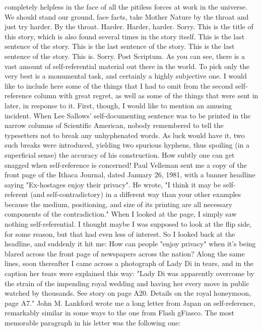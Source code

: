 completely helpless in the face of all the pitiless forces at work in the universe. We should stand our ground, face facts, take Mother Nature by the throat and just try harder. By the throat. Harder. Harder, harder. Sorry. This is the title of this story, which is also found several times in the story itself. This is the last sentence of the story. This is the last sentence of the story. This is the last sentence of the story. This is. Sorry. 
Post Scriptum. As you can see, there is a vast amount of self-referential material out there in the world. To pick only the very best is a monumental task, and certainly a highly subjective one. I would like to include here some of the things that I had to omit from the second self-reference column with great regret, as well as some of the things that were sent in later, in response to it. First, though, I would like to mention an amusing incident. When Lee Sallows' self-documenting sentence was to be printed in the narrow columns of Scientific American, nobody remembered to tell the typesetters not to break any unhyphenated words. As luck would have it, two such breaks were introduced, yielding two spurious hyphens, thus spoiling (in a superficial sense) the accuracy of his construction. How subtly one can get snagged when self-reference is concerned! Paul Velleman sent me a copy of the front page of the Ithaca Journal, dated January 26, 1981, with a banner headline saying "Ex-hostages enjoy their privacy". He wrote, "I think it may be self-referent (and self-contradictory) in a different way than your other examples because the medium, positioning, and size of its printing are all necessary components of the contradiction." When I looked at the page, I simply saw nothing self-referential. I thought maybe I was supposed to look at the flip side, for some reason, but that had even less of interest. So I looked back at the headline, and suddenly it hit me: How can people "enjoy privacy" when it's being blared across the front page of newspapers across the nation? Along the same lines, soon thereafter I came across a photograph of Lady Di in tears, and in the caption her tears were explained this way: "Lady Di was apparently overcome by the strain of the impending royal wedding and having her every move in public watched by thousands. See story on page A20. Details on the royal honeymoon, page A7." John M. Lankford wrote me a long letter from Japan on self-reference, remarkably similar in some ways to the one from Flash gFiasco. The most memorable paragraph in his letter was the following one: 




